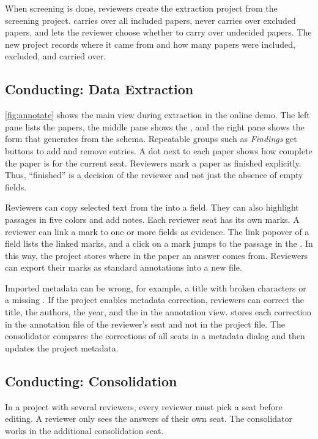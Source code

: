 When screening is done, reviewers create the extraction project from the screening project.
\SaiLoR carries over all included papers, never carries over excluded papers, and lets the reviewer choose whether to carry over undecided papers.
The new project records where it came from and how many papers were included, excluded, and carried over.

\subsection{Conducting: Data Extraction}\label{sec:tool-extraction}

\autoref{fig:annotate} shows the main view during extraction in the online demo.
The left pane lists the papers, the middle pane shows the \PDF, and the right pane shows the form that \SaiLoR generates from the schema.
Repeatable groups such as \emph{Findings} get buttons to add and remove entries.
A dot next to each paper shows how complete the paper is for the current seat.
Reviewers mark a paper as finished explicitly.
Thus, \enquote{finished} is a decision of the reviewer and not just the absence of empty fields.

Reviewers can copy selected text from the \PDF into a field.
They can also highlight passages in five colors and add notes.
Each reviewer seat has its own marks.
A reviewer can link a mark to one or more fields as evidence.
The link popover of a field lists the linked marks, and a click on a mark jumps to the passage in the \PDF.
In this way, the project stores where in the paper an answer comes from.
Reviewers can export their marks as standard \PDF annotations into a new \PDF file.

Imported metadata can be wrong, for example, a title with broken characters or a missing \DOI.
If the project enables metadata correction, reviewers can correct the title, the authors, the year, and the \DOI in the annotation view.
\SaiLoR stores each correction in the annotation file of the reviewer's seat and not in the project file.
The consolidator compares the corrections of all seats in a metadata dialog and then updates the project metadata.

\subsection{Conducting: Consolidation}\label{sec:tool-consolidation}

In a project with several reviewers, every reviewer must pick a seat before editing.
A reviewer only sees the answers of their own seat.
The consolidator works in the additional consolidation seat.

